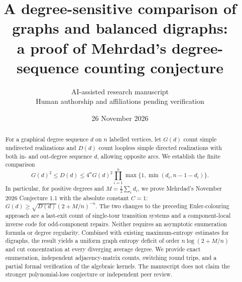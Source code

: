 \documentclass[11pt]{article}
\title{A degree-sensitive comparison of graphs and balanced digraphs:\\ a proof of Mehrdad's degree-sequence counting conjecture}
\author{AI-assisted research manuscript\\\small Human authorship and affiliations pending verification}
\date{26 November 2026}
\theoremstyle{remark}\newtheorem{remark}[theorem]{Remark}
\begin{document}
\maketitle
\begin{abstract}
For a graphical degree sequence $d$ on $n$ labelled vertices, let $G(d)$ count simple undirected realizations and $D(d)$ count loopless simple directed realizations with both in- and out-degree sequence $d$, allowing opposite arcs. We establish the finite comparison
\[
 G(d)^2\le D(d)\le 4^n G(d)^2\prod_{i=1}^n\max\{1,\min(d_i,n-1-d_i)\}.
\]
In particular, for positive degrees and $M=\tfrac12\sum_i d_i$, we prove Mehrdad's November 2026 Conjecture 1.1 with the absolute constant $C=1$: $G(d)\ge \sqrt{D(d)}(2+M/n)^{-n}$. The two changes to the preceding Euler-colouring approach are a last-exit count of single-tour transition systems and a component-local inverse code for odd-component repairs. Neither requires an asymptotic enumeration formula or degree regularity. Combined with existing maximum-entropy estimates for digraphs, the result yields a uniform graph entropy deficit of order $n\log(2+M/n)$ and cut concentration at every diverging average degree. We provide exact enumeration, independent adjacency-matrix counts, switching round trips, and a partial formal verification of the algebraic kernels. The manuscript does not claim the stronger polynomial-loss conjecture or independent peer review.
\end{abstract}
\end{document}
